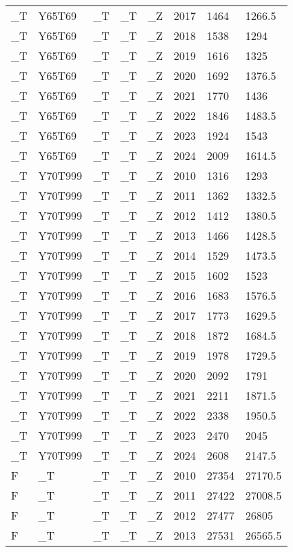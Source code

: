 \begin{longtable}[t]{llllllll}
\_T & Y65T69 & \_T & \_T & \_Z & 2017 & 1464 & 1266.5\\
\_T & Y65T69 & \_T & \_T & \_Z & 2018 & 1538 & 1294\\
\_T & Y65T69 & \_T & \_T & \_Z & 2019 & 1616 & 1325\\
\addlinespace
\_T & Y65T69 & \_T & \_T & \_Z & 2020 & 1692 & 1376.5\\
\_T & Y65T69 & \_T & \_T & \_Z & 2021 & 1770 & 1436\\
\_T & Y65T69 & \_T & \_T & \_Z & 2022 & 1846 & 1483.5\\
\_T & Y65T69 & \_T & \_T & \_Z & 2023 & 1924 & 1543\\
\_T & Y65T69 & \_T & \_T & \_Z & 2024 & 2009 & 1614.5\\
\addlinespace
\_T & Y70T999 & \_T & \_T & \_Z & 2010 & 1316 & 1293\\
\_T & Y70T999 & \_T & \_T & \_Z & 2011 & 1362 & 1332.5\\
\_T & Y70T999 & \_T & \_T & \_Z & 2012 & 1412 & 1380.5\\
\_T & Y70T999 & \_T & \_T & \_Z & 2013 & 1466 & 1428.5\\
\_T & Y70T999 & \_T & \_T & \_Z & 2014 & 1529 & 1473.5\\
\addlinespace
\_T & Y70T999 & \_T & \_T & \_Z & 2015 & 1602 & 1523\\
\_T & Y70T999 & \_T & \_T & \_Z & 2016 & 1683 & 1576.5\\
\_T & Y70T999 & \_T & \_T & \_Z & 2017 & 1773 & 1629.5\\
\_T & Y70T999 & \_T & \_T & \_Z & 2018 & 1872 & 1684.5\\
\_T & Y70T999 & \_T & \_T & \_Z & 2019 & 1978 & 1729.5\\
\addlinespace
\_T & Y70T999 & \_T & \_T & \_Z & 2020 & 2092 & 1791\\
\_T & Y70T999 & \_T & \_T & \_Z & 2021 & 2211 & 1871.5\\
\_T & Y70T999 & \_T & \_T & \_Z & 2022 & 2338 & 1950.5\\
\_T & Y70T999 & \_T & \_T & \_Z & 2023 & 2470 & 2045\\
\_T & Y70T999 & \_T & \_T & \_Z & 2024 & 2608 & 2147.5\\
\addlinespace
F & \_T & \_T & \_T & \_Z & 2010 & 27354 & 27170.5\\
F & \_T & \_T & \_T & \_Z & 2011 & 27422 & 27008.5\\
F & \_T & \_T & \_T & \_Z & 2012 & 27477 & 26805\\
F & \_T & \_T & \_T & \_Z & 2013 & 27531 & 26565.5\\

\end{longtable}
